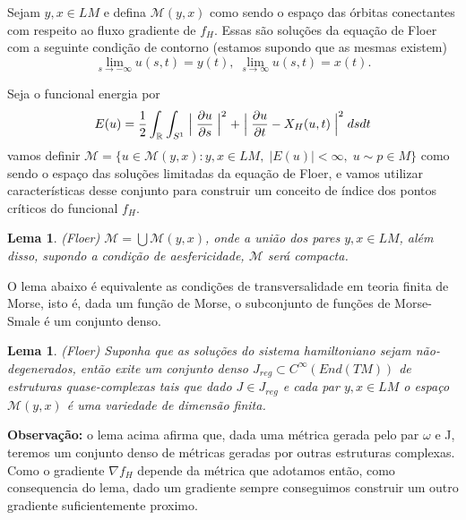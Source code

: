 \documentclass[12pt]{book}
\newtheorem{lema}[teorema]{Lema}
\newcommand{\bigmodulo}[1]{\Bigm\lvert #1 \Bigm\lvert }
\newcommand{\dparcial}[2]{\frac{\partial #1}{\partial #2}}
\newcommand{\real}[1]{\mathbb{R}^{#1}}
\newcommand{\vermelho}[1]{{\color{red}#1}}
\begin{document}
	Sejam $y, x\in LM$ e defina $\mathcal{M}(y, x)$ como sendo o espaço das órbitas conectantes com respeito ao fluxo gradiente de $f_{H}$. Essas são soluções da equação de Floer com a seguinte condição de contorno \vermelho{(estamos supondo que as mesmas existem)}
	$$
	\lim_{s\to -\infty} u(s,t) = y(t), \; 	\lim_{s\to \infty} u(s,t) = x(t). 
	$$
	
	Seja o funcional energia por
	$$
	E(u) = \frac{1}{2}\int_{\real{}} \int_{S{^{1}}} \bigmodulo{\dparcial{u}{s}}^{2} + \bigmodulo{\dparcial{u}{t} - X_{H}(u,t)}^{2}dsdt
	$$
	vamos definir $
	\mathcal{M} = \{u \in \mathcal{M}(y,x):y,x \in LM,\; |E(u)| < \infty, \; u \sim p \in M\}
	$ como sendo o espaço das soluções limitadas da equação de Floer, e vamos utilizar características desse conjunto para construir um conceito de índice dos pontos críticos do funcional $f_{H}$.
	
	\begin{lema}
		(Floer) $\mathcal{M} = \bigcup \mathcal{M}(y,x)$, onde a união dos pares $y,x \in LM$, além disso, supondo a condição de aesfericidade, $\mathcal{M}$ será compacta.
	\end{lema}
	
	O lema abaixo é equivalente as condições de transversalidade em teoria finita de Morse, isto é, dada um função de Morse, o subconjunto de funções de Morse-Smale é um conjunto denso.
	
	\begin{lema}
		(Floer) Suponha que as soluções do sistema hamiltoniano sejam não-degenerados, então exite um conjunto denso $J_{reg} \subset C^{\infty}(End(TM))$ de estruturas quase-complexas tais que dado $J \in J_{reg}$ e cada par $y,x \in LM$ o espaço $\mathcal{M}(y,x)$ é uma variedade de dimensão finita.
	\end{lema}
	
	\textbf{Observação:} o lema acima afirma que, dada uma métrica gerada pelo par $\omega$ e J, teremos um conjunto denso de métricas geradas por outras estruturas complexas. Como o gradiente $\nabla f_{H}$ depende da métrica que adotamos então, como consequencia do lema, dado um gradiente sempre conseguimos construir um outro gradiente suficientemente proximo.
	
\end{document}
